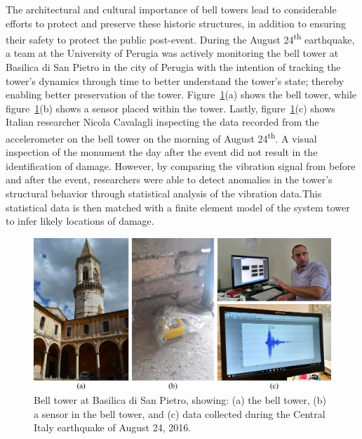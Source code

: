 \documentclass[12pt,letter]{article}
\numberwithin{ex}{section} %
\numberwithin{re}{section} %
\newtheorem{vcs}{Vibration Case Study}
\numberwithin{vcs}{section} %
\newenvironment{vibration_case_study}{\begin{mdframed}[linecolor=orange,middlelinewidth=2mm,roundcorner=20pt]\begin{vcs}\normalfont}{\end{vcs}\end{mdframed}}
\begin{document}
\begin{vibration_case_study}
			The architectural and cultural importance of bell towers lead to considerable efforts to protect and preserve these historic structures, in addition to ensuring their safety to protect the public post-event. During the August 24\textsuperscript{th} earthquake, a team at the University of Perugia was actively monitoring the bell tower at Basilica di San Pietro in the city of Perugia with the intention of tracking the tower's dynamics through time to better understand the tower's state; thereby enabling better preservation of the tower.  Figure~\ref{fig:Italy_2016_earthquake_2}(a) shows the bell tower, while figure~\ref{fig:Italy_2016_earthquake_2}(b) shows a sensor placed within the tower. Lastly, figure~\ref{fig:Italy_2016_earthquake_2}(c) shows Italian researcher Nicola Cavalagli inspecting the data recorded from the accelerometer on the bell tower on the morning of August 24\textsuperscript{th}. A visual inspection of the monument the day after the event did not result in the identification of damage. However, by comparing the vibration signal from before and after the event, researchers were able to detect anomalies in the tower's structural behavior through statistical analysis of the vibration data.\protect\footnotemark[2] This statistical data is then matched with a finite element model of the system tower to infer likely locations of damage.  
			
			\begin{figure}[H]
				\centering
				\includegraphics[width=1\textwidth]{../figures/Italy_2016_earthquake_2}
				\caption{Bell tower at Basilica di San Pietro, showing: (a) the bell tower, (b) a sensor in the bell tower, and (c) data collected during the Central Italy earthquake of August 24, 2016. \protect\footnotemark[3] }
				\label{fig:Italy_2016_earthquake_2}
			\end{figure}

												
												
		\end{vibration_case_study}
	
\end{document}
